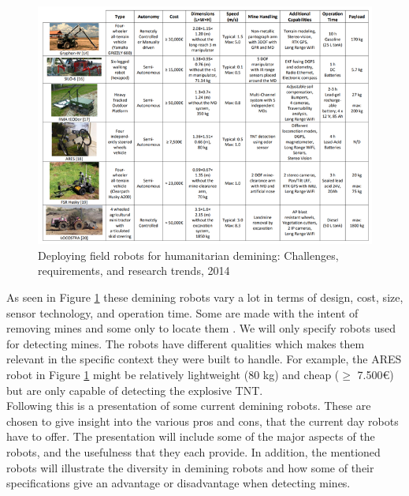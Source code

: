 \begin{figure}[ht]
  \centering
      \includegraphics[width=1\textwidth]{00 - Images/field_robots_for_humanitarian_demining_2014.png}
  \caption{Deploying field robots for humanitarian demining: Challenges, requirements, and research trends, 2014 \cite{FieldRobots2014}}
  \label{fig:field_robots_for_humanitarian_demining_2014}
\end{figure} 

As seen in Figure \ref{fig:field_robots_for_humanitarian_demining_2014} these demining robots vary a lot in terms of design, cost, size, sensor technology, and operation time. Some are made with the intent of removing mines and some only to locate them \cite{FieldRobots2014}. We will only specify robots used for detecting mines. The robots have different qualities which makes them relevant in the specific context they were built to handle. For example, the ARES robot in Figure \ref{fig:field_robots_for_humanitarian_demining_2014} might be relatively lightweight (80 kg) and cheap ($\ge$ 7.500€) but are only capable of detecting the explosive TNT.\\

Following this is a presentation of some current demining robots. These are chosen to give insight into the various pros and cons, that the current day robots have to offer. The presentation will include some of the major aspects of the robots, and the usefulness that they each provide. In addition, the mentioned robots will illustrate the diversity in demining robots and how some of their specifications give an advantage or disadvantage when detecting mines.

